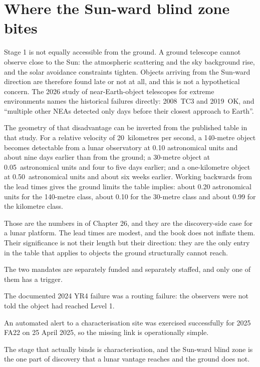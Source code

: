 \section{Where the Sun-ward blind zone bites}

Stage 1 is not equally accessible from the ground. A ground telescope cannot
observe close to the Sun: the atmospheric scattering and the sky background
rise, and the solar avoidance constraints tighten. Objects arriving from the
Sun-ward direction are therefore found late or not at all, and this is not a
hypothetical concern. The 2026 study of near-Earth-object telescopes for
extreme environments names the historical failures directly: 2008~TC3 and
2019~OK, and ``multiple other NEAs detected only days before their closest
approach to Earth''.

The geometry of that disadvantage can be inverted from the published table in
that study. For a relative velocity of 20~kilometres per second, a 140-metre
object becomes detectable from a lunar observatory at 0.10 astronomical units
and about nine days earlier than from the ground; a 30-metre object at
0.05~astronomical units and four to five days earlier; and a one-kilometre
object at 0.50~astronomical units and about six weeks earlier. Working
backwards from the lead times gives the ground limits the table implies:
about 0.20 astronomical units for the 140-metre class, about 0.10 for the
30-metre class and about 0.99 for the kilometre class.

Those are the numbers in  of Chapter 26, and they are the
discovery-side case for a lunar platform. The lead times are modest, and the
book does not inflate them. Their significance is not their length but their
direction: they are the only entry in the table that applies to objects the
ground structurally cannot reach.

\begin{keytakeaways}
\item The two mandates are separately funded and separately staffed, and only
one of them has a trigger.
\item The documented 2024 YR4 failure was a routing failure: the observers
were not told the object had reached Level 1.
\item An automated alert to a characterisation site was exercised
successfully for 2025 FA22 on 25 April 2025, so the missing link is
operationally simple.
\item The stage that actually binds is characterisation, and the Sun-ward
blind zone is the one part of discovery that a lunar vantage reaches and the
ground does not.
\end{keytakeaways}
